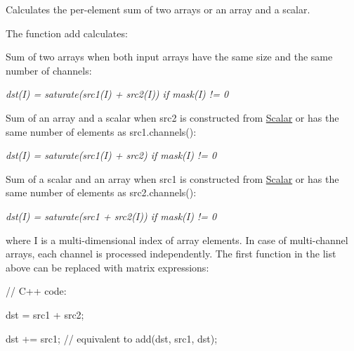 Calculates the per-\/element sum of two arrays or an array and a scalar.

The function {\ttfamily add} calculates\+:


\begin{DoxyItemize}
\item Sum of two arrays when both input arrays have the same size and the same number of channels\+: 
\end{DoxyItemize}

{\itshape dst(\+I) = saturate(src1(\+I) + src2(\+I)) if mask(\+I) != 0}


\begin{DoxyItemize}
\item Sum of an array and a scalar when {\ttfamily src2} is constructed from {\ttfamily \mbox{\hyperlink{classorg_1_1opencv_1_1core_1_1_scalar}{Scalar}}} or has the same number of elements as {\ttfamily src1.\+channels()}\+: 
\end{DoxyItemize}

{\itshape dst(\+I) = saturate(src1(\+I) + src2) if mask(\+I) != 0}


\begin{DoxyItemize}
\item Sum of a scalar and an array when {\ttfamily src1} is constructed from {\ttfamily \mbox{\hyperlink{classorg_1_1opencv_1_1core_1_1_scalar}{Scalar}}} or has the same number of elements as {\ttfamily src2.\+channels()}\+: 
\end{DoxyItemize}

{\itshape dst(\+I) = saturate(src1 + src2(\+I)) if mask(\+I) != 0}

where {\ttfamily I} is a multi-\/dimensional index of array elements. In case of multi-\/channel arrays, each channel is processed independently. The first function in the list above can be replaced with matrix expressions\+: {\ttfamily }

{\ttfamily }

{\ttfamily }

{\ttfamily // C++ code\+:}

{\ttfamily }

{\ttfamily }

{\ttfamily dst = src1 + src2;}

{\ttfamily }

{\ttfamily }

{\ttfamily dst += src1; // equivalent to add(dst, src1, dst);}

{\ttfamily }

{\ttfamily }

